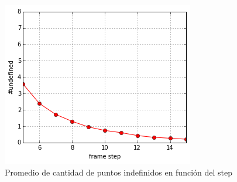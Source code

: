 \begin{figure}[bh!]
\centering
\includegraphics[scale=0.75]{images/window_selection.png}
\caption{Promedio de cantidad de puntos indefinidos en función del step}
\label{fig:window_selection_average}
\end{figure}


